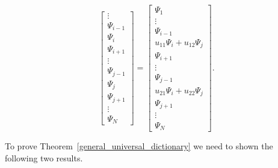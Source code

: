 \documentclass[a4paper,11pt]{article}
\begin{document}
\begin{appendices}
$$\begin{bmatrix}
    \vdots \\
    \Psi_{i-1} \\
    \Psi_i \\
    \Psi_{i+1} \\
    \vdots \\
    \Psi_{j-1} \\
    \Psi_j \\
    \Psi_{j+1} \\
    \vdots \\
    \Psi_N
  \end{bmatrix} = \begin{bmatrix}
    \Psi_1 \\
    \vdots \\
    \Psi_{i-1} \\
    u_{11}\Psi_i + u_{12}\Psi_j \\
    \Psi_{i+1} \\
    \vdots \\
    \Psi_{j-1} \\
    u_{21}\Psi_i + u_{22}\Psi_j \\
    \Psi_{j+1} \\
    \vdots \\
    \Psi_N  
  \end{bmatrix}.
  $$
  
  \bigskip
  
  To prove Theorem~\ref{general_universal_dictionary} we need to shown the following two results.
  

\end{appendices}
\end{document}
